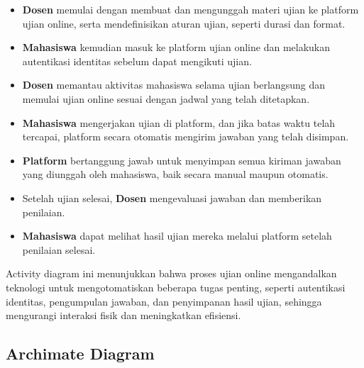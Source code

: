 \begin{itemize}
	\item \textbf{Dosen} memulai dengan membuat dan mengunggah materi ujian ke platform ujian online, serta mendefinisikan aturan ujian, seperti durasi dan format.
	\item \textbf{Mahasiswa} kemudian masuk ke platform ujian online dan melakukan autentikasi identitas sebelum dapat mengikuti ujian.
	\item \textbf{Dosen} memantau aktivitas mahasiswa selama ujian berlangsung dan memulai ujian online sesuai dengan jadwal yang telah ditetapkan.
	\item \textbf{Mahasiswa} mengerjakan ujian di platform, dan jika batas waktu telah tercapai, platform secara otomatis mengirim jawaban yang telah disimpan.
	\item \textbf{Platform} bertanggung jawab untuk menyimpan semua kiriman jawaban yang diunggah oleh mahasiswa, baik secara manual maupun otomatis.
	\item Setelah ujian selesai, \textbf{Dosen} mengevaluasi jawaban dan memberikan penilaian.
	\item \textbf{Mahasiswa} dapat melihat hasil ujian mereka melalui platform setelah penilaian selesai.
\end{itemize}

Activity diagram ini menunjukkan bahwa proses ujian online mengandalkan teknologi untuk mengotomatiskan beberapa tugas penting, seperti autentikasi identitas, pengumpulan jawaban, dan penyimpanan hasil ujian, sehingga mengurangi interaksi fisik dan meningkatkan efisiensi.

\subsection{Archimate Diagram}

